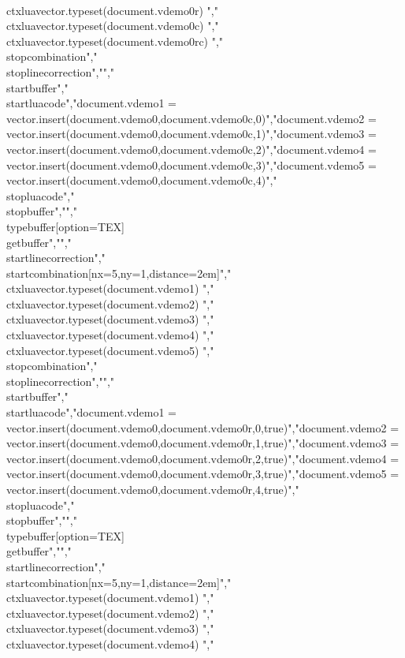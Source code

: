 {\\ctxlua{vector.typeset(document.vdemo0r)}}  {}","    {\\ctxlua{vector.typeset(document.vdemo0c)}}  {}","    {\\ctxlua{vector.typeset(document.vdemo0rc)}} {}","\\stopcombination","\\stoplinecorrection","","\\startbuffer","\\startluacode","document.vdemo1 = vector.insert(document.vdemo0,document.vdemo0c,0)","document.vdemo2 = vector.insert(document.vdemo0,document.vdemo0c,1)","document.vdemo3 = vector.insert(document.vdemo0,document.vdemo0c,2)","document.vdemo4 = vector.insert(document.vdemo0,document.vdemo0c,3)","document.vdemo5 = vector.insert(document.vdemo0,document.vdemo0c,4)","\\stopluacode","\\stopbuffer","","\\typebuffer[option=TEX] \\getbuffer","","\\startlinecorrection","\\startcombination[nx=5,ny=1,distance=2em]","    {\\ctxlua{vector.typeset(document.vdemo1)}} {}","    {\\ctxlua{vector.typeset(document.vdemo2)}} {}","    {\\ctxlua{vector.typeset(document.vdemo3)}} {}","    {\\ctxlua{vector.typeset(document.vdemo4)}} {}","    {\\ctxlua{vector.typeset(document.vdemo5)}} {}","\\stopcombination","\\stoplinecorrection","","\\startbuffer","\\startluacode","document.vdemo1 = vector.insert(document.vdemo0,document.vdemo0r,0,true)","document.vdemo2 = vector.insert(document.vdemo0,document.vdemo0r,1,true)","document.vdemo3 = vector.insert(document.vdemo0,document.vdemo0r,2,true)","document.vdemo4 = vector.insert(document.vdemo0,document.vdemo0r,3,true)","document.vdemo5 = vector.insert(document.vdemo0,document.vdemo0r,4,true)","\\stopluacode","\\stopbuffer","","\\typebuffer[option=TEX] \\getbuffer","","\\startlinecorrection","\\startcombination[nx=5,ny=1,distance=2em]","    {\\ctxlua{vector.typeset(document.vdemo1)}} {}","    {\\ctxlua{vector.typeset(document.vdemo2)}} {}","    {\\ctxlua{vector.typeset(document.vdemo3)}} {}","    {\\ctxlua{vector.typeset(document.vdemo4)}} {}","    